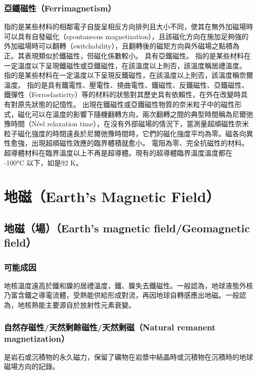 \documentclass[a4paper,12pt]{report}
\begin{document}
\begin{itemize}
\subsubsection{亞鐵磁性（Ferrimagnetism）}
指的是某些材料的相鄰電子自旋呈相反方向排列且大小不同，使其在無外加磁場時可以具有自發磁化（spontaneous magnetization），且該磁化方向在施加足夠強的外加磁場時可以翻轉（switchability），且翻轉後的磁矩方向與外磁場之點積為正。其表現類似於鐵磁性，但磁化係數較小。 具有亞鐵磁性。
指的是某些材料在一定溫度以下呈現鐵磁性或亞鐵磁性，在該溫度以上則否，該溫度稱居禮溫度。
指的是某些材料在一定溫度以下呈現反鐵磁性，在該溫度以上則否，該溫度稱奈爾溫度。
指的是具有鐵電性、壓電性、撓曲電性、鐵磁性、反鐵磁性、亞鐵磁性、鐵彈性（Ferroelasticity）等的材料的狀態對其歷史具有依賴性，在外在改變時具有對原先狀態的記憶性。
出現在鐵磁性或亞鐵磁性物質的奈米粒子中的磁性形式，磁化可以在溫度的影響下隨機翻轉方向，兩次翻轉之間的典型時間稱為尼爾弛豫時間（Néel relaxation time），在沒有外部磁場的情況下，當測量超順磁性奈米粒子磁化強度的時間遠長於尼爾弛豫時間時，它們的磁化強度平均為零。磁各向異性愈強，出現超順磁性效應的臨界體積就愈小。
電阻為零、完全抗磁性的材料。
超導體材料在臨界溫度以上不再是超導體。現有的超導體臨界溫度溫度都在 -100°C 以下，如是92 K。


\section{地磁（Earth's Magnetic Field）}
\subsection{地磁（場）（Earth's magnetic field/Geomagnetic field）}
\subsubsection{可能成因}
地核溫度遠高於鐵和鎳的居禮溫度，鐵、鎳失去鐵磁性。一般認為，地球液態外核乃富含鐵之導電流體，受熱能供給形成對流，再因地球自轉感應出地磁。一般認為，地核熱能主要源自於放射性元素衰變。
\subsubsection{自然存磁性/天然剩餘磁性/天然剩磁（Natural remanent magnetization）}
是岩石或沉積物的永久磁力，保留了礦物在岩漿中結晶時或沉積物在沉積時的地球磁場方向的記錄。

\end{itemize}
\end{document}
